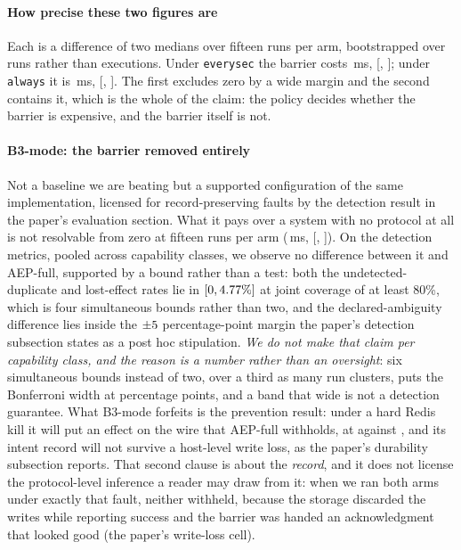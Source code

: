 \documentclass[10pt,journal,compsoc]{IEEEtran}
\begin{document}
\paragraph{How precise these two figures are} Each is a difference of two
medians over fifteen runs per arm, bootstrapped over runs rather than
executions. Under \texttt{everysec} the barrier costs
\BarrierCostFifteen{}\,ms, [\BarrierCostFifteenLow{}, \BarrierCostFifteenHigh{}];
under \texttt{always} it is \BarrierCostAlwaysFortyFive{}\,ms,
[\BarrierCostAlwaysFortyFiveLow{}, \BarrierCostAlwaysFortyFiveHigh{}]. The first
excludes zero by a wide margin and the second contains it, which is the whole
of the claim: the policy decides whether the barrier is expensive, and the
barrier itself is not.

\paragraph{B3-mode: the barrier removed entirely} Not a baseline we are beating
but a supported configuration of the same implementation, licensed for record-preserving faults by the detection result in the paper's evaluation section. What it pays over a system with no protocol at all
is not resolvable from zero at fifteen runs per arm
(\ProtocolMinusBarrierFifteen{}\,ms,
[\ProtocolMinusBarrierFifteenLow{}, \ProtocolMinusBarrierFifteenHigh{}]). On the detection metrics, pooled across capability
classes, we observe no difference between it and AEP-full, supported by a bound
rather than a test: both the undetected-duplicate and lost-effect rates lie in
$[0,4.77{}\%]$ at joint coverage of at least 80\%, which is
four simultaneous bounds rather than two, and the
declared-ambiguity difference lies inside the $\pm5{}$
percentage-point margin the paper's detection subsection states as a post hoc
stipulation. \emph{We do not make that claim per capability class, and the
reason is a number rather than an oversight}: six simultaneous bounds instead of
two, over a third as many run clusters, puts the Bonferroni width at
\AblationZeroUpperPerClass{} percentage points, and a band that wide is not a
detection guarantee. What B3-mode forfeits is the prevention result: under
a hard Redis kill it will put an effect on the wire that AEP-full withholds, at
\BthreeUnwantedRate{} against \AepUnwantedRate{}, and its intent record will not
survive a host-level write loss, as the paper's durability subsection
reports. That second
clause is about the \emph{record}, and it does not license the protocol-level
inference a reader may draw from it: when we ran both arms under exactly that
fault, neither withheld, because the storage discarded the writes while
reporting success and the barrier was handed an acknowledgment that looked
good (the paper's write-loss cell).
\end{document}
